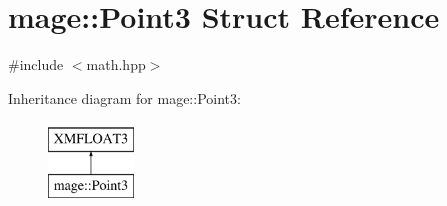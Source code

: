 \hypertarget{structmage_1_1_point3}{}\section{mage\+:\+:Point3 Struct Reference}
\label{structmage_1_1_point3}


{\ttfamily \#include $<$math.\+hpp$>$}

Inheritance diagram for mage\+:\+:Point3\+:\begin{figure}[H]
\begin{center}
\leavevmode
\includegraphics[height=2.000000cm]{structmage_1_1_point3}
\end{center}
\end{figure}
